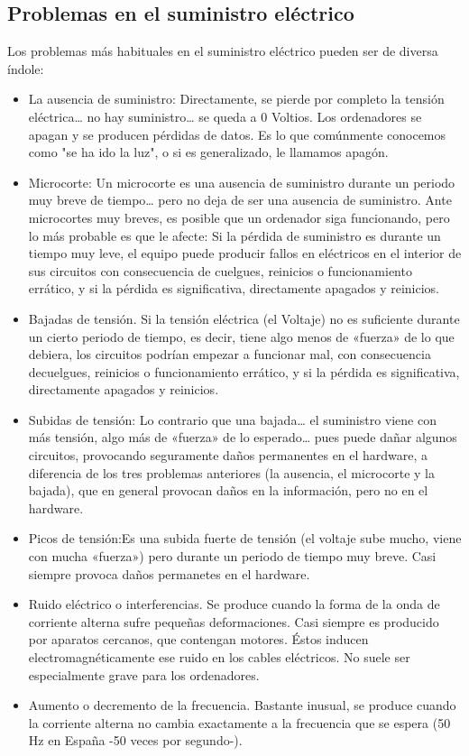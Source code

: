 \documentclass{article}
\begin{document}
\subsection{Problemas en el suministro eléctrico}
\label{sec:org0659190}

Los problemas más habituales en el suministro eléctrico pueden ser de diversa índole:
\begin{itemize}
\item La ausencia de suministro: Directamente, se pierde por completo la tensión eléctrica\ldots{} no hay suministro\ldots{} se queda a 0 Voltios. Los ordenadores se apagan y se producen pérdidas de datos. Es lo que comúnmente conocemos como "se ha ido la luz", o si es generalizado, le llamamos apagón.
\item Microcorte: Un microcorte es una ausencia de suministro durante un periodo muy breve de tiempo\ldots{} pero no deja de ser una ausencia de suministro. Ante microcortes muy breves, es posible que un ordenador siga funcionando, pero lo más probable es que le afecte: Si la pérdida de suministro es durante un tiempo muy leve, el equipo puede producir fallos en eléctricos en el interior de sus circuitos con consecuencia de cuelgues, reinicios o funcionamiento errático, y si la pérdida es significativa, directamente apagados y reinicios.
\item Bajadas de tensión. Si la tensión eléctrica (el Voltaje) no es suficiente durante un cierto periodo de tiempo, es decir, tiene algo menos de «fuerza» de lo que debiera, los circuitos podrían empezar a funcionar mal, con consecuencia decuelgues, reinicios o funcionamiento errático, y si la pérdida es significativa, directamente apagados y reinicios.
\item Subidas de tensión: Lo contrario que una bajada\ldots{} el suministro viene con más tensión, algo más de «fuerza» de lo esperado\ldots{} pues puede dañar algunos circuitos, provocando seguramente daños permanentes en el hardware, a diferencia de los tres problemas anteriores (la ausencia, el microcorte y la bajada), que en general provocan daños en la información, pero no en el hardware.
\item Picos de tensión:Es una subida fuerte de tensión (el voltaje sube mucho, viene con mucha «fuerza») pero durante un periodo de tiempo muy breve. Casi siempre provoca daños permanetes en el hardware.
\item Ruido eléctrico o interferencias. Se produce cuando la forma de la onda de corriente alterna sufre pequeñas deformaciones. Casi siempre es producido por aparatos cercanos, que contengan motores. Éstos inducen electromagnéticamente ese ruido en los cables eléctricos. No suele ser especialmente grave para los ordenadores.
\item Aumento o decremento de la frecuencia. Bastante inusual, se produce cuando la corriente alterna no cambia exactamente a la frecuencia que se espera (50 Hz en España -50 veces por segundo-).
\end{itemize}
\end{document}
